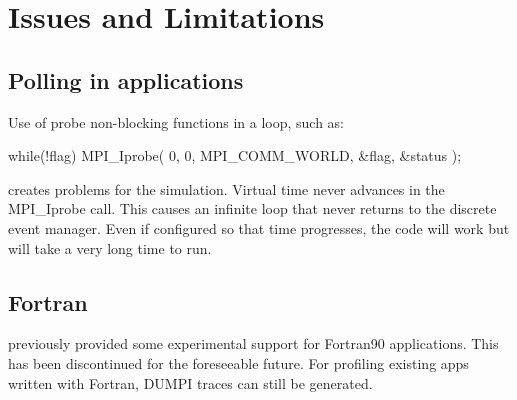 
\chapter{Issues and Limitations}
\label{ch:issues}

\section{Polling in applications}
\label{sec:polling}

Use of probe non-blocking functions in a loop, such as:


\begin{CppCode}
while(!flag){
 MPI_Iprobe( 0, 0, MPI_COMM_WORLD, &flag, &status );
}
\end{CppCode}
creates problems for the simulation. Virtual time never advances in the MPI\_Iprobe call. 
This causes an infinite loop that never returns to the discrete event manager. 
Even if configured so that time progresses, the code will work but will take a very long time to run.

\section{Fortran}
\label{subsec:issues:fortran}

\sstmacro previously provided some experimental support for Fortran90 applications. 
This has been discontinued for the foreseeable future.
For profiling existing apps written with Fortran, DUMPI traces can still be generated. 




